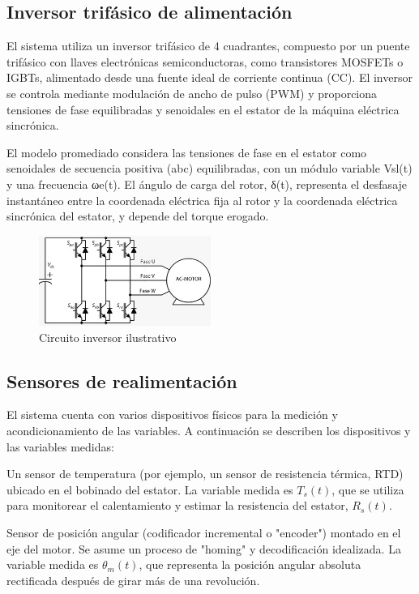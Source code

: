 \documentclass{article}
\begin{document}
\subsection{Inversor trifásico de alimentación}

El sistema utiliza un inversor trifásico de 4 cuadrantes, compuesto por un puente trifásico con llaves 
electrónicas semiconductoras, como transistores MOSFETs o IGBTs, alimentado desde una fuente ideal de 
corriente continua (CC). El inversor se controla mediante modulación de ancho de pulso (PWM) y proporciona 
tensiones de fase equilibradas y senoidales en el estator de la máquina eléctrica sincrónica.

El modelo promediado considera las tensiones de fase en el estator como senoidales de secuencia positiva 
(abc) equilibradas, con un módulo variable Vsl(t) y una frecuencia ωe(t). El ángulo de carga del rotor, 
δ(t), representa el desfasaje instantáneo entre la coordenada eléctrica fija al rotor y la coordenada 
eléctrica sincrónica del estator, y depende del torque erogado.

\begin{figure}[H]
    \centering
    \includegraphics[width=0.5\textwidth]{Alan7.jpg}
    \caption{Circuito inversor ilustrativo}
\end{figure}

\subsection{Sensores de realimentación}

El sistema cuenta con varios dispositivos físicos para la medición y acondicionamiento de las variables. A 
continuación se describen los dispositivos y las variables medidas:

Un sensor de temperatura (por ejemplo, un sensor de resistencia térmica, RTD) ubicado en el bobinado del 
estator. La variable medida es $T_s(t)$, que se utiliza para monitorear el calentamiento y estimar la 
resistencia del estator, $R_s(t)$.

Sensor de posición angular (codificador incremental o "encoder") montado en el eje del motor. Se asume un 
proceso de "homing" y decodificación idealizada. La variable medida es $\theta_m(t)$, que representa la posición 
angular absoluta rectificada después de girar más de una revolución. 
\end{document}
